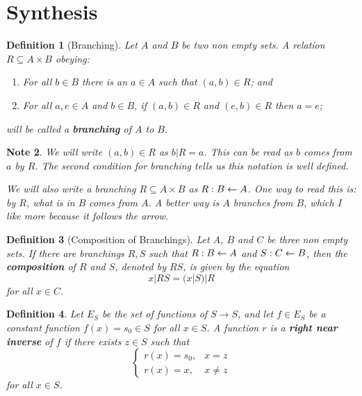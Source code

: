 \documentclass[11pt]{article}
\theoremstyle{plain}
\newtheorem{definition}{Definition}[section]
\newtheorem{note}[definition]{Note}
\theoremstyle{nonumberplain}
\begin{document}
\section{Synthesis}

\begin{definition}[Branching]
    Let $A$ and $B$ be two non empty sets. A relation $R \subseteq A \times B$ obeying: \begin{enumerate}
        \item For all $b \in B$ there is an $a \in A$ such that $(a, b) \in R$; and
        \item For all $a, e \in A$ and $b \in B$, if $(a, b) \in R$ and $(e, b) \in R$ then $a = e$;
    \end{enumerate}
    will be called a \textbf{branching} of $A$ to $B$.
\end{definition}

\begin{note}
    We will write $(a, b) \in R$ as $b | R = a$. This can be read as $b$ comes from $a$ by $R$. The second condition for branching tells us this notation is well defined.

    We will also write a branching $R \subseteq A \times B$ as $R : B \leftarrow A$. One way to read this is: by $R$, what is in $B$ comes from $A$. A better way is $A$ branches from $B$, which I like more because it follows the arrow.
\end{note}

\begin{definition}[Composition of Branchings]
    Let $A$, $B$ and $C$ be three non empty sets. If there are branchings $R, S$ such that $R : B \leftarrow A$ and $S : C \leftarrow B$, then the \textbf{composition} of $R$ and $S$, denoted by $RS$, is given by the equation \begin{equation}
        x | RS = (x | S) | R
    \end{equation}
    for all $x \in C$.
\end{definition}

\begin{definition}
    Let $E_S$ be the set of functions of $S \to S$, and let $f \in E_S$ be a constant function $f(x) = s_0 \in S$ for all $x \in S$. A function $r$ is a \textbf{right near inverse} of $f$ if there exists $z \in S$ such that \begin{equation}
        \begin{cases}
            r(x) = s_0, & x = z \\
            r(x) = x, & x \neq z
        \end{cases}
    \end{equation}
    for all $x \in S$.
\end{definition}
\end{document}
